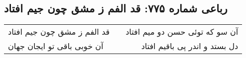 \begin{center}
\section*{رباعی شماره ۷۷۵: قد الفم ز مشق چون جیم افتاد}
\label{sec:0775}
\begin{longtable}{l p{0.5cm} r}
قد الفم ز مشق چون جیم افتاد
&&
آن سو که توئی حسن دو میم افتاد
\\
آن خوبی باقی تو ایجان جهان
&&
دل بستد و اندر پی باقیم افتاد
\\
\end{longtable}
\end{center}
